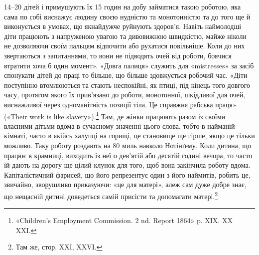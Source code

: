 \parcont{}  %
14--20 дітей і примушують їх 15 годин на добу займатися такою
роботою, яка сама по собі виснажує людину своєю нудністю та
монотонністю та до того ще й виконується в умовах, що якнайдужче
руйнують здоров’я. Навіть наймолодші діти працюють з
напруженою увагою та дивовижною швидкістю, майже ніколи
не дозволяючи своїм пальцям відпочити або рухатися повільніше.
Коли до них звертаються з запитаннями, то вони не підводять очей
від роботи, боячися втратити хоча б один момент». «Довга палиця»
служить для «mistresses» за засіб спонукати дітей до праці то
більше, що більше здовжується робочий час. «Діти поступінно
втомлюються та стають неспокійні, як птиці, під кінець того довгого
часу, протягом якого їх прив’язано до роботи, монотонної, шкідливої
для очей, виснажливої через одноманітність позиції тіла.
Це справжня рабська праця» («Their work is like slavery»).\footnote{
«Children’s Employment Commission. 2 nd. Report 1864» p. XIX.
XX XXI.
}
Там, де жінки працюють разом із своїми власними дітьми вдома
в сучасному значенні цього слова, тобто в найманій кімнаті,
часто в якійсь халупці на горищі, це становище ще гірше, якщо
це тільки можливо. Таку роботу роздають на 80 миль навколо
Нотінґему. Коли дитина, що працює в крамниці, виходить із неї
о дев’ятій або десятій годині вечора, то часто їй дають на дорогу
ще цілий клунок для того, щоб вона закінчила роботу вдома.
Капіталістичний фарисей, що його репрезентує один з його наймитів,
робить це, звичайно, зворушливо приказуючи: «це для
матері», алеж сам дуже добре знає, що нещасній дитині доведеться
самій присісти та допомагати матері.\footnote{
Там же, стор. XXI, XXVI.
}

